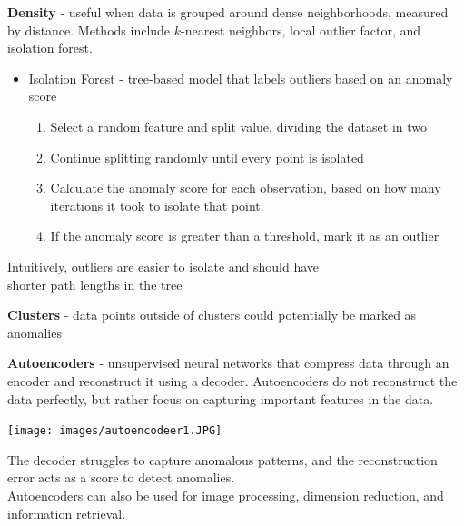 \documentclass[10pt,landscape]{article}
\begin{document}
\begin{multicols}{3}
\textbf{Density} - useful when data is grouped around dense neighborhoods, measured by distance. Methods include $k$-nearest neighbors, local outlier factor, and isolation forest.
\begin{itemize}[label={--},leftmargin=4mm]
\itemsep -.4mm
\item Isolation Forest - tree-based model that labels outliers based on an anomaly score\\
\vspace{-1.5mm}
\begin{enumerate}[leftmargin=4mm]
\itemsep -.4mm
\item Select a random feature and split value, dividing the dataset in two
\item Continue splitting randomly until every point is isolated
\item Calculate the anomaly score for each observation, based on how many iterations it took to isolate that point.
\item If the anomaly score is greater than a threshold, mark it as an outlier
\end{enumerate}
\end{itemize}
\vspace{-2.5mm}
\hspace{4mm}Intuitively, outliers are easier to isolate and should have\\\hspace{4mm}shorter path lengths in the tree

\vspace{1mm}
\textbf{Clusters} - data points outside of clusters could potentially be marked as anomalies

\vspace{1mm}
\textbf{Autoencoders} - unsupervised neural networks that compress data through an encoder and reconstruct it using a decoder. Autoencoders do not reconstruct the data perfectly, but rather focus on capturing important features in the data.
\begin{center}
\vspace{-2mm}
    \texttt{[image: images/autoencodeer1.JPG]}
    \vspace{-2mm}
\end{center}
The decoder struggles to capture anomalous patterns, and the reconstruction error acts as a score to detect anomalies.
\\
\smallskip
Autoencoders can also be used for image processing, dimension reduction, and information retrieval.
\smallskip


\end{multicols}
\end{document}
